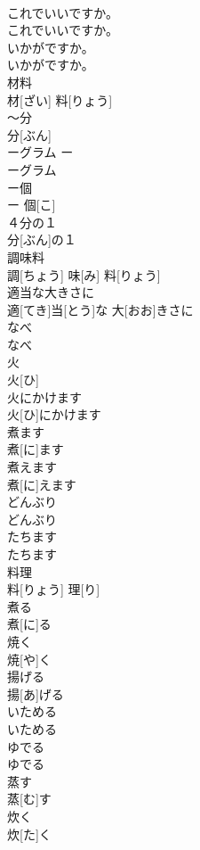 \documentclass[8pt]{extreport}
\begin{document}
\begin{CJK}{UTF8}{min}
\\	これでいいですか。	
\\	これでいいですか。		
\\	いかがですか。	
\\	いかがですか。		
\\	材料	
\\	材[ざい] 料[りょう]		
\\	～分	
\\	分[ぶん]		
\\	ーグラム	ー 
\\	ーグラム		
\\	ー個	
\\	ー 個[こ]		
\\	４分の１
\\	分[ぶん]の１
\\	調味料	
\\	調[ちょう] 味[み] 料[りょう]		
\\	適当な大きさに	
\\	適[てき]当[とう]な 大[おお]きさに		
\\	なべ	
\\	なべ		
\\	火	
\\	火[ひ]		
\\	火にかけます	
\\	火[ひ]にかけます		
\\	煮ます	
\\	煮[に]ます		
\\	煮えます	
\\	煮[に]えます		
\\	どんぶり	
\\	どんぶり		
\\	たちます	
\\	たちます		
\\	料理	
\\	料[りょう] 理[り]		
\\	煮る	
\\	煮[に]る		
\\	焼く	
\\	焼[や]く		
\\	揚げる	
\\	揚[あ]げる		
\\	いためる	
\\	いためる		
\\	ゆでる	
\\	ゆでる		
\\	蒸す	
\\	蒸[む]す		
\\	炊く	
\\	炊[た]く		

\end{CJK}
\end{document}
